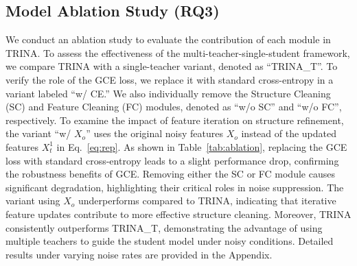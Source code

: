 \documentclass[sigconf, anonymous, review]{acmart}
\begin{document}
  \subsection{Model Ablation Study (RQ3)}
    We conduct an ablation study to evaluate the contribution of each module in TRINA. To assess the effectiveness of the multi-teacher-single-student framework, we compare TRINA with a single-teacher variant, denoted as ``TRINA\_T''. To verify the role of the GCE loss, we replace it with standard cross-entropy in a variant labeled ``w/ CE.'' We also individually remove the Structure Cleaning (SC) and Feature Cleaning (FC) modules, denoted as ``w/o SC'' and ``w/o FC'', respectively. To examine the impact of feature iteration on structure refinement, the variant ``w/ $X_o$'' uses the original noisy features $X_o$ instead of the updated features $X_t^1$ in Eq.~\ref{eq:rep}.
    As shown in Table~\ref{tab:ablation}, replacing the GCE loss with standard cross-entropy leads to a slight performance drop, confirming the robustness benefits of GCE. Removing either the SC or FC module causes significant degradation, highlighting their critical roles in noise suppression. The variant using $X_o$ underperforms compared to TRINA, indicating that iterative feature updates contribute to more effective structure cleaning. Moreover, TRINA consistently outperforms TRINA\_T, demonstrating the advantage of using multiple teachers to guide the student model under noisy conditions. Detailed results under varying noise rates are provided in the Appendix.
\end{document}
